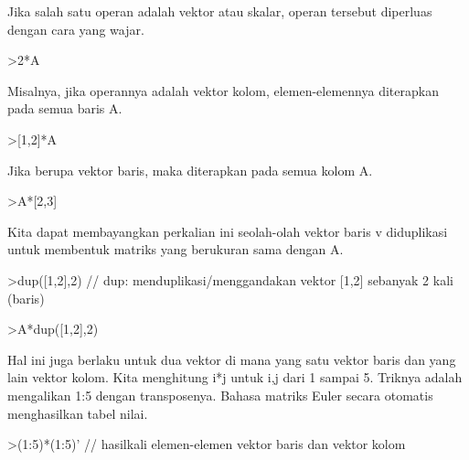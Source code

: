 \documentclass[a4paper,10pt]{article}
\begin{document}
\begin{eulernotebook}
\begin{euleroutput}
  Jika salah satu operan adalah vektor atau skalar, operan tersebut diperluas dengan cara yang wajar.
  
\end{euleroutput}
\begin{eulerprompt}
>2*A
\end{eulerprompt}
\begin{euleroutput}
  
  Misalnya, jika operannya adalah vektor kolom, elemen-elemennya diterapkan pada semua baris A.
  
\end{euleroutput}
\begin{eulerprompt}
>[1,2]*A
\end{eulerprompt}
\begin{euleroutput}
  
  Jika berupa vektor baris, maka diterapkan pada semua kolom A.
  
\end{euleroutput}
\begin{eulerprompt}
>A*[2,3]
\end{eulerprompt}
\begin{euleroutput}
  
  Kita dapat membayangkan perkalian ini seolah-olah vektor baris v diduplikasi untuk membentuk matriks yang berukuran sama dengan A.
  
\end{euleroutput}
\begin{eulerprompt}
>dup([1,2],2) // dup: menduplikasi/menggandakan vektor [1,2] sebanyak 2 kali (baris)
\end{eulerprompt}
\begin{euleroutput}
  
\end{euleroutput}
\begin{eulerprompt}
>A*dup([1,2],2)
\end{eulerprompt}
\begin{euleroutput}
  
  Hal ini juga berlaku untuk dua vektor di mana yang satu vektor baris dan yang lain vektor kolom. Kita menghitung i*j untuk i,j dari 1 sampai 5. Triknya adalah mengalikan 1:5 dengan transposenya. Bahasa matriks Euler secara otomatis menghasilkan tabel nilai.
  
\end{euleroutput}
\begin{eulerprompt}
>(1:5)*(1:5)' // hasilkali elemen-elemen vektor baris dan vektor kolom
\end{eulerprompt}
\begin{euleroutput}
  

\end{euleroutput}
\end{eulernotebook}
\end{document}
